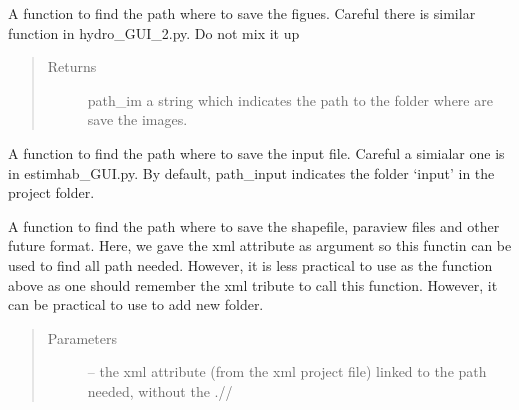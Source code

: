 \documentclass[letterpaper,10pt,english]{sphinxmanual}
\begin{document}
\begin{fulllineitems}
\begin{fulllineitems}
\end{fulllineitems}


\begin{fulllineitems}
\label{\detokenize{index:src_GUI.estimhab_GUI.StatModUseful.find_path_im_est}}
A function to find the path where to save the figues. Careful there is similar function in hydro\_GUI\_2.py.
Do not mix it up
\begin{quote}\begin{description}
\item[{Returns}] \leavevmode
path\_im a string which indicates the path to the folder where are save the images.

\end{description}\end{quote}

\end{fulllineitems}


\begin{fulllineitems}
\label{\detokenize{index:src_GUI.estimhab_GUI.StatModUseful.find_path_input_est}}
A function to find the path where to save the input file. Careful a simialar one is in estimhab\_GUI.py. By default,
path\_input indicates the folder `input' in the project folder.

\end{fulllineitems}


\begin{fulllineitems}
\label{\detokenize{index:src_GUI.estimhab_GUI.StatModUseful.find_path_output_est}}
A function to find the path where to save the shapefile, paraview files and other future format. Here, we gave
the xml attribute as argument so this functin can be used to find all path needed. However, it is less practical
to use as the function above as one should remember the xml tribute to call this function. However, it can be
practical to use to add new folder.
\begin{quote}\begin{description}
\item[{Parameters}] \leavevmode
{} -- the xml attribute (from the xml project file) linked to the path needed, without the .//


\end{description}
\end{quote}
\end{fulllineitems}
\end{fulllineitems}
\end{document}
